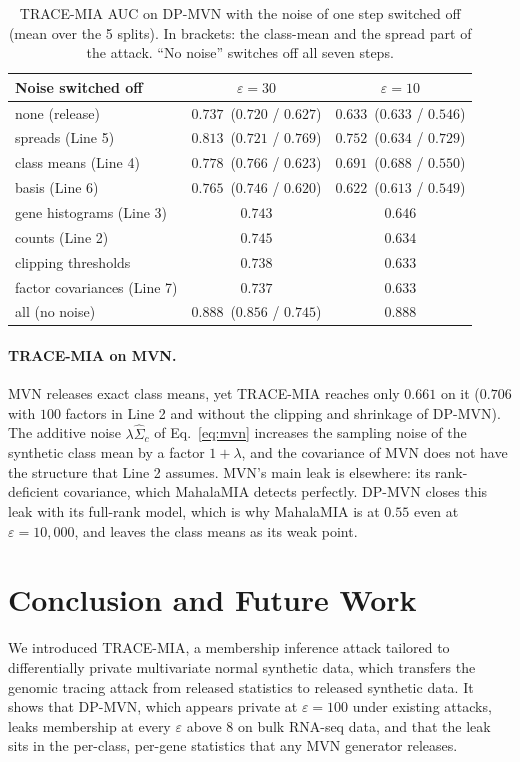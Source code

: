 \documentclass{article}
\newcommand{\dpmvn}{DP-MVN}
\newcommand{\ours}{TRACE-MIA}
\begin{document}
\begin{table}[h]
\centering
\caption{\ours{} AUC on \dpmvn{} with the noise of one step switched off (mean over the 5 splits). In brackets: the class-mean and the spread part of the attack. ``No noise'' switches off all seven steps.}
\label{tab:ablation}
\footnotesize
\setlength{\tabcolsep}{4pt}
\begin{tabular}{lcc}
\toprule
Noise switched off & $\varepsilon=30$ & $\varepsilon=10$ \\
\midrule
none (release)              & $0.737$ \,($0.720$ / $0.627$) & $0.633$ \,($0.633$ / $0.546$) \\
spreads (Line 5)            & $0.813$ \,($0.721$ / $0.769$) & $0.752$ \,($0.634$ / $0.729$) \\
class means (Line 4)        & $0.778$ \,($0.766$ / $0.623$) & $0.691$ \,($0.688$ / $0.550$) \\
basis (Line 6)              & $0.765$ \,($0.746$ / $0.620$) & $0.622$ \,($0.613$ / $0.549$) \\
gene histograms (Line 3)    & $0.743$ & $0.646$ \\
counts (Line 2)             & $0.745$ & $0.634$ \\
clipping thresholds         & $0.738$ & $0.633$ \\
factor covariances (Line 7) & $0.737$ & $0.633$ \\
\midrule
all (no noise)              & $0.888$ \,($0.856$ / $0.745$) & $0.888$ \\
\bottomrule
\end{tabular}
\end{table}

\paragraph{\ours{} on MVN.}
MVN releases exact class means, yet \ours{} reaches only $0.661$ on it ($0.706$ with $100$ factors in Line 2 and without the clipping and shrinkage of \dpmvn{}). The additive noise $\lambda\hat\Sigma_c$ of Eq.~\eqref{eq:mvn} increases the sampling noise of the synthetic class mean by a factor $1+\lambda$, and the covariance of MVN does not have the structure that Line 2 assumes. MVN's main leak is elsewhere: its rank-deficient covariance, which MahalaMIA detects perfectly. \dpmvn{} closes this leak with its full-rank model, which is why MahalaMIA is at $0.55$ even at $\varepsilon=10{,}000$, and leaves the class means as its weak point.

\section{Conclusion and Future Work}
We introduced \ours{}, a membership inference attack tailored to differentially private multivariate normal synthetic data, which transfers the genomic tracing attack from released statistics to released synthetic data. It shows that \dpmvn{}, which appears private at $\varepsilon=100$ under existing attacks, leaks membership at every $\varepsilon$ above $8$ on bulk RNA-seq data, and that the leak sits in the per-class, per-gene statistics that any MVN generator releases.
\end{document}
